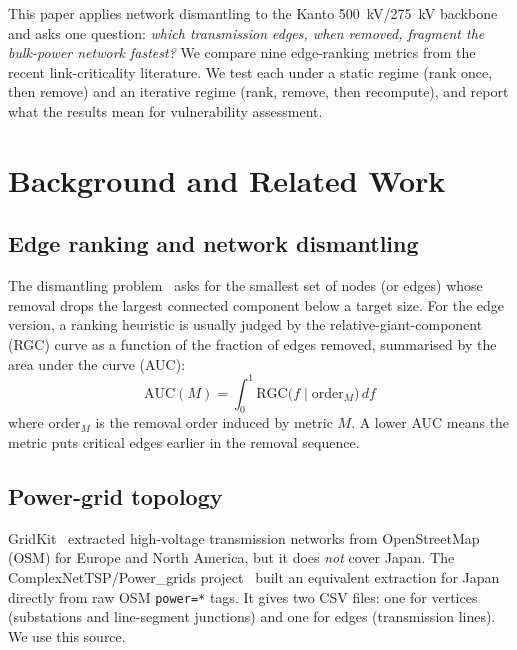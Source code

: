 \documentclass[11pt,a4paper]{article}
\begin{document}
This paper applies network dismantling to the Kanto
\SI{500}{\kilo\volt}/\SI{275}{\kilo\volt} backbone and asks one
question: \emph{which transmission edges, when removed, fragment the
bulk-power network fastest?} We compare nine edge-ranking metrics from
the recent link-criticality literature. We test each under a static
regime (rank once, then remove) and an iterative regime (rank, remove,
then recompute), and report what the results mean for vulnerability
assessment.

\section{Background and Related Work}
\label{sec:background}

\subsection{Edge ranking and network dismantling}
The dismantling problem~\cite{braunstein2016network} asks for the
smallest set of nodes (or edges) whose removal drops the largest
connected component below a target size. For the edge version, a ranking
heuristic is usually judged by the relative-giant-component (RGC) curve
as a function of the fraction of edges removed, summarised by the area
under the curve (AUC):
\begin{equation}
\text{AUC}(M) = \int_0^1 \text{RGC}\bigl(f \mid \text{order}_M\bigr)\, df
\label{eq:auc}
\end{equation}
where $\text{order}_M$ is the removal order induced by metric $M$. A
lower AUC means the metric puts critical edges earlier in the removal
sequence.

\subsection{Power-grid topology}
GridKit~\cite{wiegmans2016gridkit} extracted high-voltage transmission
networks from OpenStreetMap (OSM) for Europe and North America, but it
does \emph{not} cover Japan. The ComplexNetTSP/Power\_grids
project~\cite{complexnettsp2023} built an equivalent extraction for
Japan directly from raw OSM \texttt{power=*} tags. It gives two CSV
files: one for vertices (substations and line-segment junctions) and one
for edges (transmission lines). We use this source.
\end{document}
